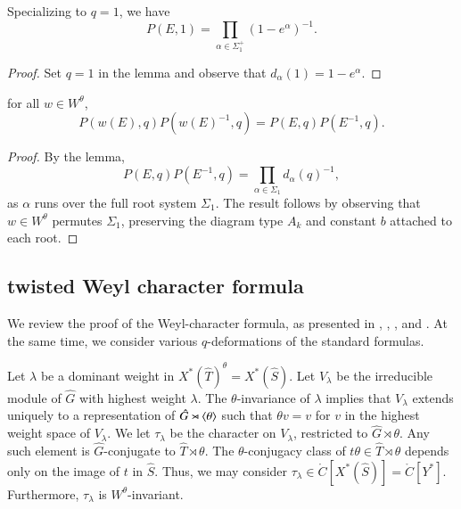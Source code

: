 \begin{corollary}\label{cor:prod1} Specializing to $q=1$, we have
\[
P(E,1) = \prod_{\alpha\in\Sigma^+_1} (1-e^{\alpha})^{-1}.
\]
\end{corollary}

\begin{proof}  Set $q=1$ in the lemma and observe that $d_\alpha(1)=1-e^\alpha$.
\end{proof}


\begin{corollary}\label{cor:weyl-p}  
for all $w\in W^\theta$,
\[
P(w(E),q) P(w(E)^{-1},q) = P(E,q)P(E^{-1},q).
\]
\end{corollary}

\begin{proof} 
By the lemma,
\[
P(E,q)P(E^{-1},q) = \prod_{\alpha\in \Sigma_1} d_{\alpha}(q)^{-1},
\]
as $\alpha$ runs over the full root system $\Sigma_1$.
The result follows by observing  that $w\in W^\theta$ permutes $\Sigma_1$, preserving the  diagram type $A_k$
 and constant $b$ attached to each root.
\end{proof}


\subsection{twisted Weyl character formula}

We review the proof of the Weyl-character formula, as presented in \cite{kostant1961lie}, 
\cite{jantzen1977darstellungen}, \cite{wendt2001weyl}, and \cite{kumar2009characters}.
At the same time, we consider various $q$-deformations of the standard formulas.

Let $\lambda$ be a dominant weight in $X^*(\hat T)^\theta = X^*(\hat S)$.  Let $V_\lambda$ be the irreducible module
of $\hat G$ with highest weight $\lambda$.  The $\theta$-invariance of $\lambda$ implies that $V_\lambda$
extends uniquely to a representation of $\hat G \rtimes \langle{\theta}\rangle$ such that $\theta v = v$ for $v$ in the
highest weight space of $V_\lambda$.  We let $\tau_\lambda$ be the character on $V_\lambda$, restricted to $\hat G\rtimes\theta$.  Any such element is $\hat G$-conjugate to $\hat T\rtimes\theta$.
The $\theta$-conjugacy class of $t\theta\in \hat T\rtimes\theta$ 
depends only on the image of $t$ in $\hat S$.  
Thus, we may consider
$\tau_\lambda\in \ring{C}[X^*(\hat S)] =\ring{C}[Y^*]$.  Furthermore, $\tau_\lambda$ is $W^\theta$-invariant.

